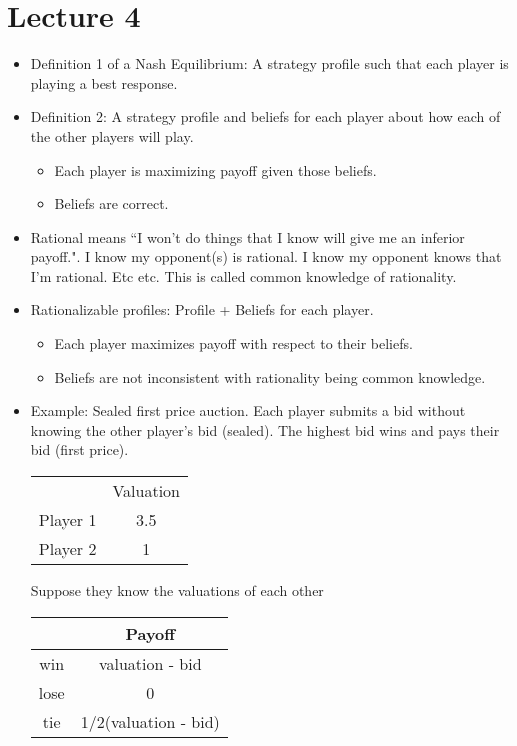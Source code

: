 \documentclass{article}
\begin{document}
\section*{Lecture 4}
\begin{itemize}
  \item Definition 1 of a Nash Equilibrium: A strategy profile such that each player is playing a best response.
  \item Definition 2: A strategy profile and beliefs for each player about how each of the other players will play.
  \begin{itemize}
    \item Each player is maximizing payoff given those beliefs.
    \item Beliefs are correct.
  \end{itemize}
  \item Rational means ``I won't do things that I know will give me an inferior payoff.". I know my opponent(s) is rational. I know my opponent knows that I'm rational. Etc etc. This is called common knowledge of rationality.
  \item Rationalizable profiles: Profile + Beliefs for each player. \begin{itemize}
    \item Each player maximizes payoff with respect to their beliefs.
    \item Beliefs are not inconsistent with rationality being common knowledge.
  \end{itemize}
  \item Example: Sealed first price auction. Each player submits a bid without knowing the other player's bid (sealed). The highest bid wins and pays their bid (first price).
  \begin{center}
  \begin{tabular}{c|c}
    & Valuation \\
    Player 1 & 3.5 \\
    Player 2 & 1
  \end{tabular}
\end{center}
Suppose they know the valuations of each other
\begin{center}
\begin{tabular}{c|c}
& Payoff \\\hline
win & valuation - bid \\
lose & 0 \\
tie & 1/2(valuation - bid)
\end{tabular}
\end{center}


\end{itemize}
\end{document}
